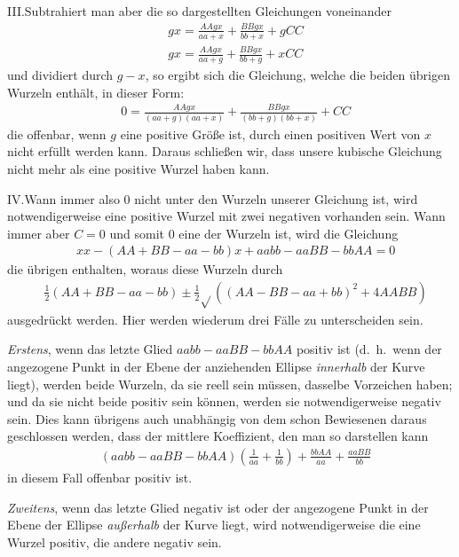 III.\quad Subtrahiert man aber die so dargestellten Gleichungen voneinander
\[
\begin{aligned}
&gx=\frac{AAgx}{aa+x}+\frac{BBgx}{bb+x}+gCC\\[6pt]
&gx=\frac{AAgx}{aa+g}+\frac{BBgx}{bb+g}+xCC
\end{aligned}
\]
und dividiert durch \(g-x\), so ergibt sich die Gleichung, welche die beiden übrigen Wurzeln enthält, in dieser Form:
\[
\begin{aligned}
&0=\frac{AAgx}{(aa+g)(aa+x)}+\frac{BBgx}{(bb+g)(bb+x)}+CC
\end{aligned}
\]
die offenbar, wenn \(g\) eine positive Größe ist, durch einen positiven Wert von \(x\) nicht erfüllt werden kann. Daraus schließen wir, dass unsere kubische Gleichung nicht mehr als eine positive Wurzel haben kann.
\par
{}
IV.\quad Wann immer also \(0\) nicht unter den Wurzeln unserer Gleichung ist, wird notwendigerweise eine positive Wurzel mit zwei negativen vorhanden sein. Wann immer aber \(C=0\) und somit \(0\) eine der Wurzeln ist, wird die Gleichung
\[
\begin{aligned}
&xx-(AA+BB-aa-bb)x+aabb-aaBB-bbAA=0
\end{aligned}
\]
die übrigen enthalten, woraus diese Wurzeln durch
\[
\begin{aligned}
&\frac12(AA+BB-aa-bb)\pm\frac12\surd\!\left((AA-BB-aa+bb)^2+4AABB\right)
\end{aligned}
\]
ausgedrückt werden. Hier werden wiederum drei Fälle zu unterscheiden sein.

\textit{Erstens}, wenn das letzte Glied \(aabb-aaBB-bbAA\) positiv ist (d.\ h.\ wenn der angezogene Punkt in der Ebene der anziehenden Ellipse \textit{innerhalb} der Kurve liegt), werden beide Wurzeln, da sie reell sein müssen, dasselbe Vorzeichen haben; und da sie nicht beide positiv sein können, werden sie notwendigerweise negativ sein. Dies kann übrigens auch unabhängig von dem schon Bewiesenen daraus geschlossen werden, dass der mittlere Koeffizient, den man so darstellen kann
\[
\begin{aligned}
&(aabb-aaBB-bbAA)\left(\frac1{aa}+\frac1{bb}\right)+\frac{bbAA}{aa}+\frac{aaBB}{bb}
\end{aligned}
\]
in diesem Fall offenbar positiv ist.

\textit{Zweitens}, wenn das letzte Glied negativ ist oder der angezogene Punkt in der Ebene der Ellipse \textit{außerhalb} der Kurve liegt, wird notwendigerweise die eine Wurzel positiv, die andere negativ sein.

